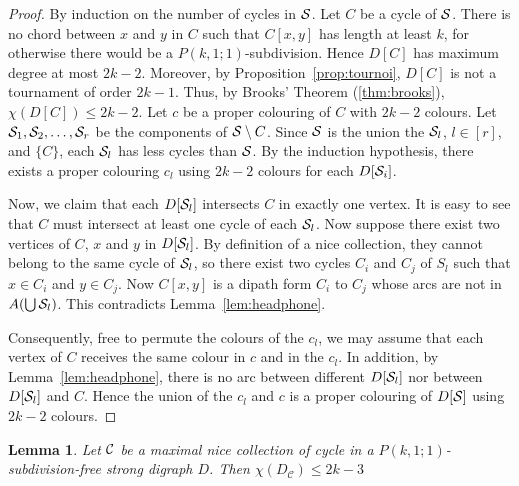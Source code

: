 \documentclass[utf8,10pt]{article}
\theoremstyle{plain}
\newtheorem{lemma}[theorem]{Lemma}
\theoremstyle{definition}
\theoremstyle{remark}
\begin{document}
\begin{proof}
By induction on the number of cycles in ${\cal S}$. Let $C$ be a cycle of ${\cal S}$. There is no chord between $x$ and $y$ in $C$
such that $C[x,y]$ has length at least $k$, for otherwise there would be a $P(k,1;1)$-subdivision. Hence $D[C]$ has maximum degree at most $2k-2$. Moreover, by Proposition~\ref{prop:tournoi}, $D[C]$ is not a tournament of order $2k-1$.
Thus, by Brooks' Theorem (\ref{thm:brooks}), $\chi(D[C])\leq 2k-2$.
 Let $c$ be a proper colouring of $C$ with $2k-2$ colours. Let ${\cal S}_1, {\cal S}_2, \dots, {\cal S}_r$ be the components of ${\cal S} \setminus{C}$. Since ${\cal S}$ is the union the ${\cal S}_l$, $l\in [r]$, and $\{C\}$,
each ${\cal S}_l$ has less cycles than ${\cal S}$. By the induction hypothesis, there exists a proper colouring $c_l$ using $2k-2$ colours for each $D[{\cal S}_i]$.
 
Now, we claim that each $D[{\cal S}_l]$ intersects $C$ in exactly one vertex. It is easy to see that $C$ must intersect at least one cycle of each ${\cal S}_l$.
Now suppose there exist two vertices of $C$, $x$ and $y$ in $D[{\cal S}_l]$. By definition of a nice collection, they cannot belong to the same cycle 
of ${\cal S}_l$, so there exist two cycles $C_i$ and $C_j$ of $S_l$ such that $x \in C_i$ and $y \in C_j$. Now $C[x,y]$ is a dipath form $C_i$ to $C_j$ whose arcs are not in $A(\bigcup {\cal S}_l)$. This contradicts Lemma~\ref{lem:headphone}. 

Consequently, free to permute the colours of the $c_l$,
we may assume that each vertex of $C$ receives the same colour in $c$ and in the $c_l$. 
In addition, by Lemma~\ref{lem:headphone}, there is no arc between different $D[{\cal S}_l]$ nor between $D[{\cal S}_l]$ and $C$. Hence the union of the 
$c_l$ and $c$ is a proper colouring of $D[{\cal S}]$ using $2k-2$ colours. 
\end{proof}


\begin{lemma}\label{lem:reduce}
Let ${\cal C}$ be a maximal nice collection of cycle in a $P(k,1;1)$-subdivision-free strong digraph $D$. Then $\chi(D_{\mathcal{C}}) \leq 2k-3$
\end{lemma}
\end{document}
